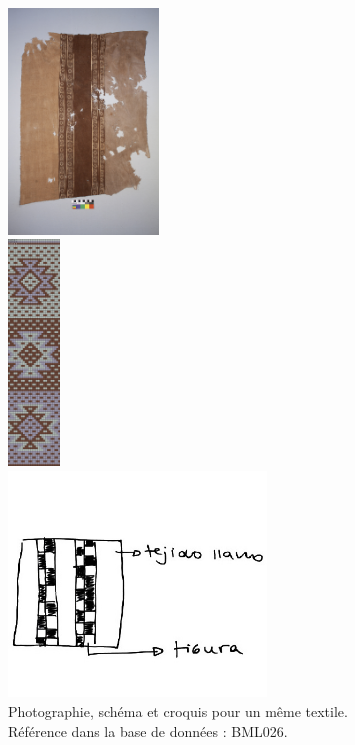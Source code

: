 \begin{figure}[!h]
    \begin{minipage}[c]{.4\linewidth}
            \begin{center}
                \includegraphics[height=6cm]{../images/BML026_IMG.jpg}
            \end{center}
    \end{minipage}
\hspace{5pt}
        \begin{minipage}[c]{.2\linewidth}
        \begin{center}
        		\includegraphics[height=6cm]{../images/BML026_Schema.png}
	\end{center}
    \end{minipage}
            \begin{minipage}[c]{.4\linewidth}
        \begin{center}
        		\includegraphics[height=6cm]{../images/BML026_croquis.jpg}
	\end{center}
    \end{minipage}
    \caption{Photographie, schéma et croquis pour un même textile. \\ Référence dans la base de données : BML026.}
\end{figure}

